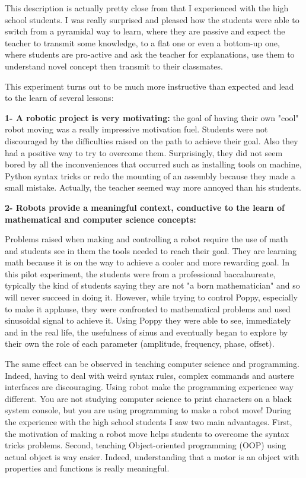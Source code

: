 This description is actually pretty close from that I experienced with the high school students. I was really surprised and pleased how the students were able to switch from a pyramidal way to learn, where they are passive and expect the teacher to transmit some knowledge, to a flat one or even a bottom-up one, where students are pro-active and ask the teacher for explanations, use them to understand novel concept then transmit to their classmates.

This experiment turns out to be much more instructive than expected and lead to the learn of several lessons:

\textbf{1- A robotic project is very motivating:} the goal of having their own "cool" robot moving was a really impressive motivation fuel. Students were not discouraged by the difficulties raised on the path to achieve their goal. Also they had a positive way to try to overcome them. Surprisingly, they did not seem bored by all the inconveniences that occurred such as installing tools on machine, Python syntax tricks or redo the mounting of an assembly because they made a small mistake. Actually, the teacher seemed way more annoyed than his students.

\textbf{2- Robots provide a meaningful context, conductive to the learn of mathematical and computer science concepts:}

Problems raised when making and controlling a robot require the use of math and students see in them the tools needed to reach their goal. They are learning math because it is on the way to achieve a cooler and more rewarding goal. In this pilot experiment, the students were from a professional baccalaureate, typically the kind of students saying they are not "a born mathematician" and so will never succeed in doing it. However, while trying to control Poppy, especially to make it applause, they were confronted to mathematical problems and used sinusoidal signal to achieve it. Using Poppy they were able to see, immediately and in the real life, the usefulness of sinus and eventually began to explore by their own the role of each parameter (amplitude, frequency, phase, offset).

The same effect can be observed in teaching computer science and programming. Indeed, having to deal with weird syntax rules, complex commands and austere interfaces are discouraging. Using robot make the programming experience way different. You are not studying computer science to print characters on a black system console, but you are using programming to make a robot move!
During the experience with the high school students I saw two main advantages. First, the motivation of making a robot move helps students to overcome the syntax tricks problems. Second, teaching Object-oriented programming (OOP) using actual object is way easier. Indeed, understanding that a motor is an object with properties and functions is really meaningful.


